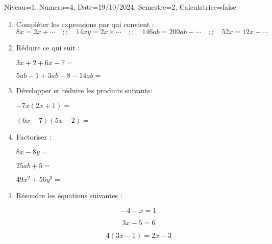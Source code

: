 \documentclass[a4paper,12pt]{article}
\begin{document}
\begin{Maquette}[DS]{Niveau=1, Numero=4, Date=19/10/2024, Semestre=2, Calculatrice=false}

\begin{exercice}

\begin{enumerate}


\item{} Compléter les expressions par qui convient :
\[
 8x = 2x + \cdots\quad ;; \quad
 14xy = 2x \times \cdots\quad ;; \quad
 146 ab = 200 ab - \cdots\quad ;; \quad
 52 x = 12 x + \cdots
\]

\item{} Réduire ce qui suit :
\begin{multicols}{2}
$3x+2+6x-7=$\anserline[3]
\columnbreak

$5ab-1+3ab-8-14ab=$\anserline[3]

\end{multicols}

\item{} Développer et réduire les produits suivants:
\begin{multicols}{2}
$-7x(2x+1)=$\anserline[2]

\columnbreak

$(6x-7)(5x-2)=$\anserline[2]
\end{multicols}

\item{} Factoriser :
\begin{multicols}{3}
$8x-8y=$\anserline[2]

\columnbreak

$25ab+5=$\anserline[2]

\columnbreak

$49x^{2}+56y^{3}=$\anserline[2]
\end{multicols}
\end{enumerate}

\end{exercice}

\begin{exercice}
\begin{enumerate}

\item{} Résoudre les équations suivantes :
\begin{multicols}{3}
 \[-4-x=1\]
\anserline[4]
\columnbreak

 \[3x-5=6\]
\anserline[4]
\columnbreak

 \[4(3x-1)=2x-3\]
\anserline[4]
\end{multicols}

\end{enumerate}
\end{exercice}



\end{Maquette}
\end{document}
